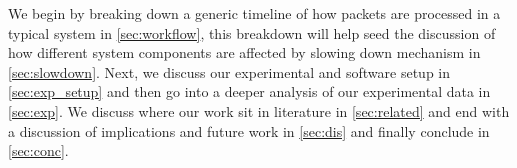 We begin by breaking down a generic timeline of how packets are processed in a typical system in \cref{sec:workflow}, this breakdown will help seed the discussion of how different system components are affected by slowing down mechanism in \cref{sec:slowdown}. Next, we discuss our experimental and software setup in \cref{sec:exp_setup} and then go into a deeper analysis of our experimental data in \cref{sec:exp}. We discuss where our work sit in literature in \cref{sec:related} and end with a discussion of implications and future work in \cref{sec:dis} and finally conclude in \cref{sec:conc}. 

	
	



